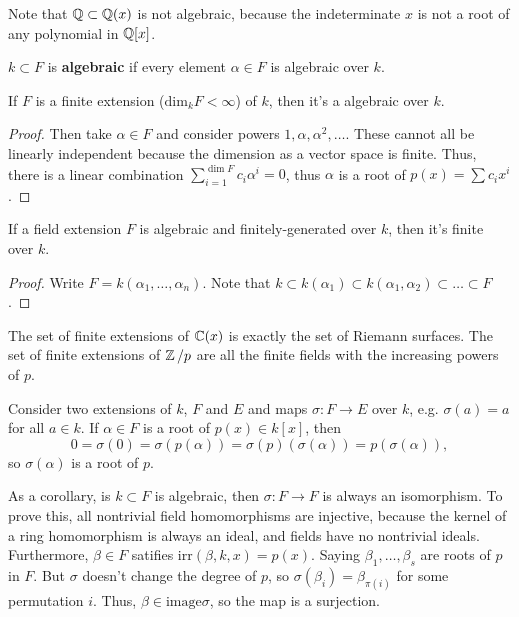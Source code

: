 Note that $\operatorname{\mathbb{Q}} \subset \operatorname{\mathbb{Q}}(x)$ is not algebraic, because the indeterminate $x$ is not a root of any polynomial
in $\operatorname{\mathbb{Q}}[x]$.

\begin{definition}
    $k \subset F$ is \textbf{algebraic} if every element $\alpha \in F$ is
    algebraic over $k$.    
\end{definition}

\begin{theorem}
If $F$ is a finite extension ($\text{dim}_k F < \infty$) of $k$,
then it's a algebraic over $k$.

\begin{proof}    
Then take $\alpha \in F$
and consider powers $1, \alpha, \alpha^2, \dots$.
These cannot all be linearly independent because the dimension as a
vector space is finite. Thus, there is a linear combination $\sum_{i = 1}^{\dim F} c_i \alpha^i = 0$,
thus $\alpha$ is a root of $p(x) = \sum c_i x^i$.
\end{proof}
\end{theorem}

\begin{theorem}
    If a field extension $F$ is algebraic and finitely-generated over $k$,
    then it's finite over $k$.
    \begin{proof}
        Write $F = k(\alpha_1, \dots, \alpha_n)$.
        Note that $k \subset k(\alpha_1) 
        \subset k(\alpha_1, \alpha_2)
        \subset \dots \subset F$.
    \end{proof}
\end{theorem}

The set of finite extensions of $\operatorname{\mathbb{C}}(x)$
is exactly the set of Riemann surfaces.
The set of finite extensions of $\operatorname{\mathbb{Z}}/p$ are all the finite fields
with the increasing powers of $p$.

\begin{theorem}
    Consider two extensions of $k$, $F$ and $E$ and
    maps $\sigma: F \to E$ over $k$, e.g. $\sigma(a) = a$
    for all $a \in k$. If $\alpha \in F$ is a root of $p(x) \in k[x]$,
    then 
    \[ 0 = \sigma(0) = \sigma(p(\alpha)) = \sigma(p)(\sigma(\alpha)) = p(\sigma(\alpha)),\]
    so $\sigma(\alpha)$ is a root of $p$.
\end{theorem}
As a corollary, is $k \subset F$ is algebraic, then $\sigma: F \to F$ is
always an isomorphism. To prove this, all nontrivial field homomorphisms are injective, because
the kernel of a ring homomorphism is always an ideal, and fields have no nontrivial ideals.
Furthermore, $\beta \in F$ satifies $\text{irr}(\beta, k, x) = p(x)$.
Saying $\beta_1, \dots, \beta_s$ are roots of $p$ in $F$.
But $\sigma$ doesn't change the degree of $p$,
so $\sigma(\beta_i) = \beta_{\pi(i)}$ for some permutation $i$. Thus, $\beta \in \text{image} \sigma$,
so the map is a surjection.


